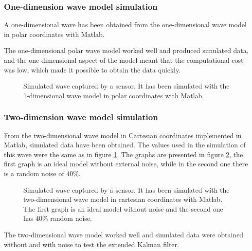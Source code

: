 \documentclass[12pt, a4paper]{article} %
\begin{document}
\setlength{\parskip}{0mm}

\subsubsection{One-dimension wave model simulation}

\setlength{\parskip}{0mm}

A one-dimensional wave has been obtained from the one-dimensional wave model in polar coordinates with Matlab. 

The one-dimensional polar wave model worked well and produced simulated data, and the one-dimensional aspect of the model meant that the computational cost was low, which made it possible to obtain the data quickly.
\setlength{\parskip}{4mm}
\begin{figure}[htbp]
    \centering
    
    \caption{Simulated wave captured by a sensor. It has been simulated with the 1-dimensional wave model in polar coordinates with Matlab.}
    \label{fig:modelo1}
\end{figure}
\setlength{\parskip}{0mm}

\subsubsection{Two-dimension wave model simulation}

From the two-dimensional wave model in Cartesian coordinates implemented in Matlab, simulated data have been obtained. The values used in the simulation of this wave were the same as in figure \ref{fig:modelo1}. The graphs are presented in figure \ref{fig:modelo2}, the first graph is an ideal model without external noise, while in the second one there is a random noise of 40\%.

\setlength{\parskip}{4mm}

\begin{figure}[h!]
    \centering
    
    \caption{Simulated wave captured by a sensor. It has been simulated with the two-dimensional wave model in cartesian coordinates with Matlab. The first graph is an ideal model without noise and the second one has 40\% random noise.}
    \label{fig:modelo2}
\end{figure}
The two-dimensional wave model worked well and simulated data were obtained without and with noise to test the extended Kalman filter.
\end{document}
